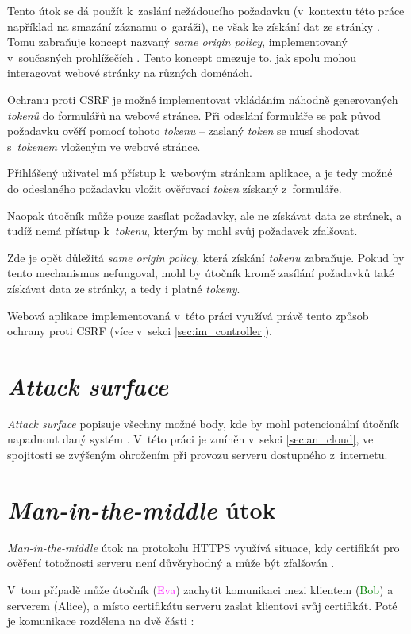Tento útok se dá použít k~zaslání nežádoucího požadavku (v~kontextu této práce například na smazání záznamu o~garáži), ne však ke získání dat ze stránky \cite{csrf_owasp}. Tomu zabraňuje koncept nazvaný \textit{same origin policy}, implementovaný v~současných prohlížečích \cite{sec_handbook}. Tento koncept omezuje to, jak spolu mohou interagovat webové stránky na různých doménách.

Ochranu proti CSRF je možné implementovat vkládáním náhodně generovaných \textit{tokenů} do formulářů na webové stránce. Při odeslání formuláře se pak původ požadavku ověří pomocí tohoto \textit{tokenu} -- zaslaný \textit{token} se musí shodovat s~\textit{tokenem} vloženým ve webové stránce.

Přihlášený uživatel má přístup k~webovým stránkam aplikace, a je tedy možné do odeslaného požadavku vložit ověřovací \textit{token} získaný z~formuláře. 

Naopak útočník může pouze zasílat požadavky, ale ne získávat data ze stránek, a tudíž nemá přístup k~\textit{tokenu}, kterým by mohl svůj požadavek zfalšovat.

Zde je opět důležitá \textit{same origin policy}, která získání \textit{tokenu} zabraňuje. Pokud by tento mechanismus nefungoval, mohl by útočník kromě zasílání požadavků také získávat data ze stránky, a tedy i platné \textit{tokeny}.

Webová aplikace implementovaná v~této práci využívá právě tento způsob ochrany proti CSRF (více v~sekci \ref{sec:im_controller}).

\section{\textit{Attack surface}}

\textit{Attack surface} popisuje všechny možné body, kde by mohl potencionální útočník napadnout daný systém \cite{attack_surface_owasp}. V~této práci je zmíněn v~sekci \ref{sec:an_cloud}, ve spojitosti se zvýšeným ohrožením při provozu serveru dostupného z~internetu.

\section{\textit{Man-in-the-middle} útok}

\textit{Man-in-the-middle} útok na protokolu HTTPS využívá situace, kdy certifikát pro ověření totožnosti serveru není důvěryhodný a může být zfalšován \cite{mitm}. 

V~tom případě může útočník (\textcolor{magenta}{Eva}) zachytit komunikaci mezi klientem (\textcolor{green}{Bob}) a serverem (\textcolor{blue2}{Alice}), a místo certifikátu serveru zaslat klientovi svůj certifikát. Poté je komunikace rozdělena na dvě části \cite{mitm}:

